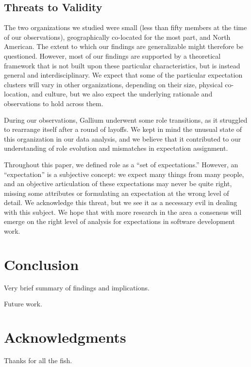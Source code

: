\documentclass[10pt, conference, compsocconf]{IEEEtran}
\begin{document}


\subsection{Threats to Validity}

The two organizations we studied were small (less than fifty members at the time of our observations), geographically co-located for the most part, and North American. The extent to which our findings are generalizable might therefore be questioned. However, most of our findings are supported by a theoretical framework that is not built upon these particular characteristics, but is instead general and interdisciplinary. We expect that some of the particular expectation clusters will vary in other organizations, depending on their size, physical co-location, and culture, but we also expect the underlying rationale and observations to hold across them.

During our observations, Gallium underwent some role transitions, as it struggled to rearrange itself after a round of layoffs. We kept in mind the unusual state of this organization in our data analysis, and we believe that it contributed to our understanding of role evolution and mismatches in expectation assignment.

Throughout this paper, we defined role as a ``set of expectations.'' However, an ``expectation'' is a subjective concept: we expect many things from many people, and an objective articulation of these expectations may never be quite right, missing some attributes or formulating an expectation at the wrong level of detail. We acknowledge this threat, but we see it as a necessary evil in dealing with this subject. We hope that with more research in the area a consensus will emerge on the right level of analysis for expectations in software development work.




\section{Conclusion}

Very brief summary of findings and implications.

Future work.



\section*{Acknowledgments}
Thanks for all the fish.



\end{document}
